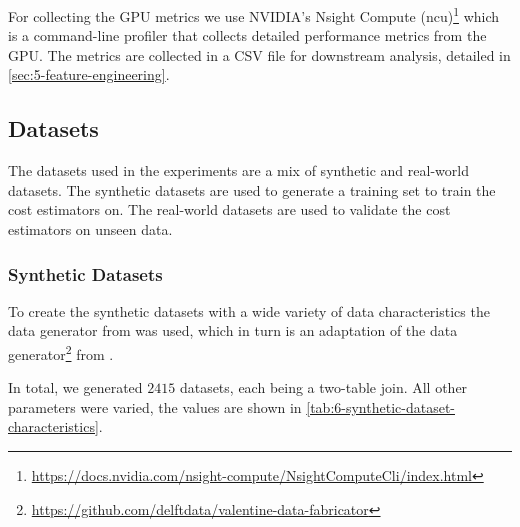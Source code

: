 For collecting the GPU metrics we use NVIDIA's Nsight Compute (ncu)\footnote{\url{https://docs.nvidia.com/nsight-compute/NsightComputeCli/index.html}} which is a command-line profiler that collects detailed performance metrics from the GPU. The metrics are collected in a CSV file for downstream analysis, detailed in \autoref{sec:5-feature-engineering}.

\subsection{Datasets}
\label{subsec:6-datasets}
The datasets used in the experiments are a mix of synthetic and real-world datasets. The synthetic datasets are used to generate a training set to train the cost estimators on. The real-world datasets are used to validate the cost estimators on unseen data.

\subsubsection{Synthetic Datasets}
To create the synthetic datasets with a wide variety of data characteristics the data generator from \cite{schijndel_cost_estimation} was used, which in turn is an adaptation of the data generator\footnote{\url{https://github.com/delftdata/valentine-data-fabricator}} from \cite{valentine-data-generator}.

In total, we generated $2415$ datasets, each being a two-table join. All other parameters were varied, the values are shown in \autoref{tab:6-synthetic-dataset-characteristics}.


